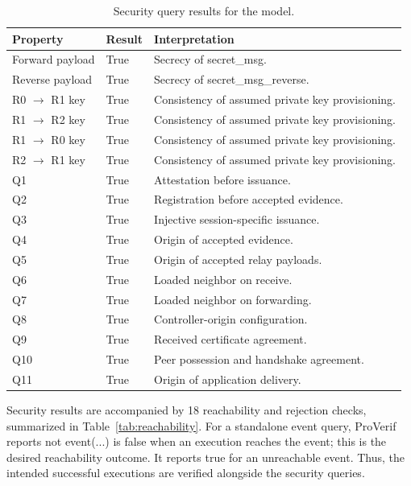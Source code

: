 \documentclass[futureinternet,article,submit,moreauthors]{Definitions/mdpi}
\begin{document}
\begin{table}[H]
\caption{Security query results for the model.\label{tab:security_results}}
\begin{tabularx}{\textwidth}{llL}
\toprule
\textbf{Property} & \textbf{Result} & \textbf{Interpretation}\\
\midrule
Forward payload & True & Secrecy of secret\_msg.\\
Reverse payload & True & Secrecy of secret\_msg\_reverse.\\
R0 $\rightarrow$ R1 key & True & Consistency of assumed private key provisioning.\\
R1 $\rightarrow$ R2 key & True & Consistency of assumed private key provisioning.\\
R1 $\rightarrow$ R0 key & True & Consistency of assumed private key provisioning.\\
R2 $\rightarrow$ R1 key & True & Consistency of assumed private key provisioning.\\
Q1 & True & Attestation before issuance.\\
Q2 & True & Registration before accepted evidence.\\
Q3 & True & Injective session-specific issuance.\\
Q4 & True & Origin of accepted evidence.\\
Q5 & True & Origin of accepted relay payloads.\\
Q6 & True & Loaded neighbor on receive.\\
Q7 & True & Loaded neighbor on forwarding.\\
Q8 & True & Controller-origin configuration.\\
Q9 & True & Received certificate agreement.\\
Q10 & True & Peer possession and handshake agreement.\\
Q11 & True & Origin of application delivery.\\
\bottomrule
\end{tabularx}
\end{table}

Security results are accompanied by 18 reachability and rejection checks, summarized in Table~\ref{tab:reachability}. For a standalone event query, ProVerif reports not event(...) is false when an execution reaches the event; this is the desired reachability outcome. It reports true for an unreachable event. Thus, the intended successful executions are verified alongside the security queries.
\end{document}
